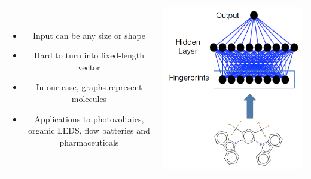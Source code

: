 \documentclass[landscape,a0b,final,a4resizeable]{include/a0poster}
\begin{document}
\begin{poster}
\vspace*{3cm}

\Large




\begin{multicols}{3}



\begin{tabular}{cc}
\begin{minipage}[c]{0.45\columnwidth}
\begin{itemize}
  \item Input can be any size or shape
  \item Hard to turn into fixed-length vector
  \item In our case, graphs represent molecules
  \item Applications to photovoltaics, organic LEDS, flow batteries and pharmaceuticals
\end{itemize}
\end{minipage} & 
\begin{minipage}[c]{0.55\columnwidth}
\centerline{\includegraphics[width=1.0\columnwidth, clip, trim=4mm 0mm 4mm 4mm]{figures/how-fingerprints.png}}
\end{minipage}
\end{tabular}


\end{multicols}
\end{poster}
\end{document}

